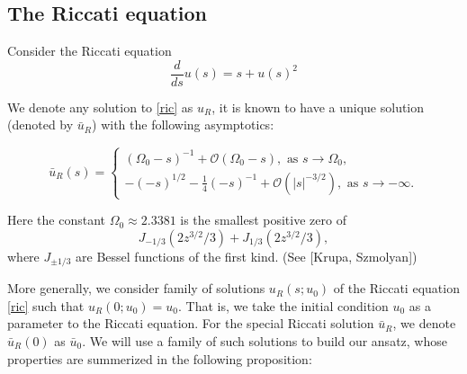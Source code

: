 \documentclass[letterpaper,11pt]{article}
\newcommand{\rmO}{\mathcal{O}}
\numberwithin{equation}{section}
\theoremstyle{plain}
\begin{document}
\subsection{The Riccati equation}
Consider the Riccati equation
\begin{equation}\label{ric}
\frac{d}{ds}u(s) = s+u(s)^2
\end{equation}

We denote any solution to \eqref{ric} as $u_R$, it is known to have a unique solution (denoted by $\bar{u}_R$) with the following asymptotics:

\begin{equation} \label{ricasy}
\bar{u}_R(s)=\begin{cases}
  (\Omega_0-s)^{-1}+\rmO(\Omega_0-s), \text{ as }s \to \Omega_0, \\
 -(-s)^{1/2} -\frac{1}{4}(-s)^{-1} + \rmO(|s|^{-3/2}), \text{ as }s \to -\infty.
\end{cases}
\end{equation}

Here the constant $\Omega_0 \approx 2.3381$ is the smallest positive zero of 
\[
J_{-1/3}(2z^{3/2}/3)+J_{1/3}(2z^{3/2}/3),
\]
where $J_{\pm 1/3}$ are Bessel functions of the first kind. (See [Krupa, Szmolyan])


More generally, we consider family of solutions  $u_R(s; u_0)$ of the Riccati equation  \eqref{ric} such that $u_R(0; u_0) = u_0$. That is, we take the initial condition $u_0$ as a parameter to the Riccati equation. For the special Riccati solution $\bar{u}_R$, we denote $\bar{u}_R(0) $ as $\bar{u}_0$. We will use a family of such solutions to build our ansatz, whose properties are summerized in the following proposition:
\end{document}
